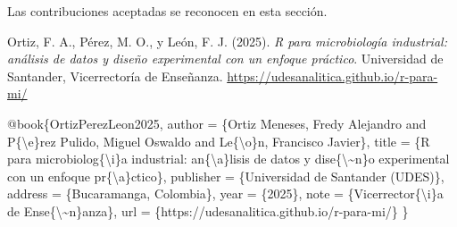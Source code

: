 \documentclass[
  spanish,
  letterpaper,
  DIV=11,
  numbers=noendperiod]{scrreprt}
\newenvironment{Shaded}{\begin{snugshade}}{\end{snugshade}}
\newcommand{\CharTok}[1]{\textcolor[rgb]{0.13,0.47,0.30}{#1}}
\newcommand{\DataTypeTok}[1]{\textcolor[rgb]{0.68,0.00,0.00}{#1}}
\newcommand{\NormalTok}[1]{\textcolor[rgb]{0.00,0.23,0.31}{#1}}
\newcommand{\OtherTok}[1]{\textcolor[rgb]{0.00,0.23,0.31}{#1}}
\newcommand{\VariableTok}[1]{\textcolor[rgb]{0.07,0.07,0.07}{#1}}
\begin{document}
Las contribuciones aceptadas se reconocen en esta sección.

\begin{tcolorbox}[enhanced jigsaw, colback=white, breakable, toptitle=1mm, toprule=.15mm, colbacktitle=quarto-callout-note-color!10!white, bottomrule=.15mm, coltitle=black, titlerule=0mm, opacityback=0, leftrule=.75mm, bottomtitle=1mm, colframe=quarto-callout-note-color-frame, left=2mm, title=\textcolor{quarto-callout-note-color}{\faInfo}\hspace{0.5em}{Para citar}, rightrule=.15mm, opacitybacktitle=0.6, arc=.35mm]

Ortiz, F. A., Pérez, M. O., y León, F. J. (2025). \emph{R para
microbiología industrial: análisis de datos y diseño experimental con un
enfoque práctico}. Universidad de Santander, Vicerrectoría de Enseñanza.
\url{https://udesanalitica.github.io/r-para-mi/}

\end{tcolorbox}

\begin{Shaded}
\begin{Highlighting}[]
\VariableTok{@book}\NormalTok{\{}\OtherTok{OrtizPerezLeon2025}\NormalTok{,}
  \DataTypeTok{author}\NormalTok{    = \{Ortiz Meneses, Fredy Alejandro and P\{}\CharTok{\textbackslash{}\textquotesingle{}}\NormalTok{e\}rez Pulido, Miguel Oswaldo and Le\{}\CharTok{\textbackslash{}\textquotesingle{}}\NormalTok{o\}n, Francisco Javier\},}
  \DataTypeTok{title}\NormalTok{     = \{R para microbiolog\{}\CharTok{\textbackslash{}\textquotesingle{}}\NormalTok{i\}a industrial: an\{}\CharTok{\textbackslash{}\textquotesingle{}}\NormalTok{a\}lisis de datos y dise\{}\CharTok{\textbackslash{}\textasciitilde{}}\NormalTok{n\}o experimental con un enfoque pr\{}\CharTok{\textbackslash{}\textquotesingle{}}\NormalTok{a\}ctico\},}
  \DataTypeTok{publisher}\NormalTok{ = \{Universidad de Santander (UDES)\},}
  \DataTypeTok{address}\NormalTok{   = \{Bucaramanga, Colombia\},}
  \DataTypeTok{year}\NormalTok{      = \{2025\},}
  \DataTypeTok{note}\NormalTok{      = \{Vicerrector\{}\CharTok{\textbackslash{}\textquotesingle{}}\NormalTok{i\}a de Ense\{}\CharTok{\textbackslash{}\textasciitilde{}}\NormalTok{n\}anza\},}
  \DataTypeTok{url}\NormalTok{       = \{https://udesanalitica.github.io/r{-}para{-}mi/\}}
\NormalTok{\}}
\end{Highlighting}
\end{Shaded}
\end{document}
